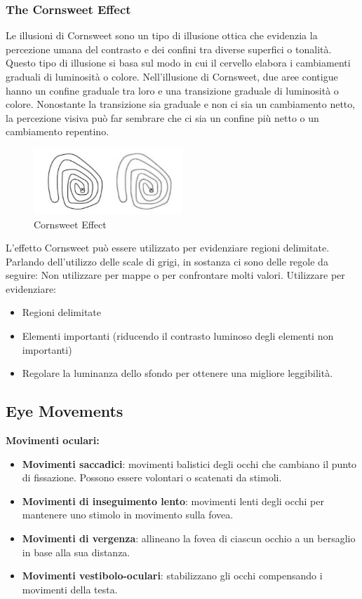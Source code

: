 \subsubsection{The Cornsweet Effect}
Le illusioni di Cornsweet sono un tipo di illusione ottica che evidenzia la percezione umana del contrasto e dei confini tra diverse superfici o tonalità. Questo tipo di illusione si basa sul modo in cui il cervello elabora i cambiamenti graduali di luminosità o colore.
Nell'illusione di Cornsweet, due aree contigue hanno un confine graduale tra loro e una transizione graduale di luminosità o colore. Nonostante la transizione sia graduale e non ci sia un cambiamento netto, la percezione visiva può far 
sembrare che ci sia un confine più netto o un cambiamento repentino.
\begin{figure}[H]
    \centering
    \includegraphics[width=0.5\textwidth]{images/Cornsweet.png} 
    \caption{Cornsweet Effect}
    \label{fig:immagine}
\end{figure}
L'effetto Cornsweet può essere utilizzato per evidenziare regioni delimitate.
Parlando dell'utilizzo delle scale di grigi, in sostanza ci sono delle regole da seguire:
Non utilizzare per mappe o per confrontare molti valori.
Utilizzare per evidenziare:
\begin{itemize}
    \item Regioni delimitate
    \item Elementi importanti (riducendo il contrasto luminoso degli elementi non importanti)
    \item Regolare la luminanza dello sfondo per ottenere una migliore leggibilità.
\end{itemize}
\subsection{Eye Movements}
\textbf{Movimenti oculari:}
\begin{itemize}
    \item \textbf{Movimenti saccadici}: movimenti balistici degli occhi che cambiano il punto di fissazione. Possono essere volontari o scatenati da stimoli.
    \item \textbf{Movimenti di inseguimento lento}: movimenti lenti degli occhi per mantenere uno stimolo in movimento sulla fovea.
    \item \textbf{Movimenti di vergenza}: allineano la fovea di ciascun occhio a un bersaglio in base alla sua distanza.
    \item \textbf{Movimenti vestibolo-oculari}: stabilizzano gli occhi compensando i movimenti della testa.

\end{itemize}
